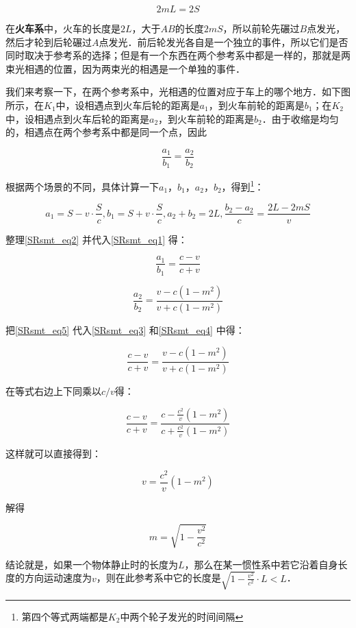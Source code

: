 \begin{equation}\label{SRsmt_eq1}
2mL=2S
\end{equation}

在\textbf{火车系}中，火车的长度是$2L$，大于$AB$的长度$2mS$，所以前轮先碾过$B$点发光，然后才轮到后轮碾过$A$点发光．前后轮发光各自是一个独立的事件，所以它们是否同时取决于参考系的选择；但是有一个东西在两个参考系中都是一样的，那就是两束光相遇的位置，因为两束光的相遇是一个单独的事件．

我们来考察一下，在两个参考系中，光相遇的位置对应于车上的哪个地方．如下图所示，在$K_1$中，设相遇点到火车后轮的距离是$a_1$，到火车前轮的距离是$b_1$；在$K_2$中，设相遇点到火车后轮的距离是$a_2$，到火车前轮的距离是$b_2$．由于收缩是均匀的，相遇点在两个参考系中都是同一个点，因此

\begin{equation}\label{SRsmt_eq5}
\frac{a_1}{b_1}=\frac{a_2}{b_2}
\end{equation}

根据两个场景的不同，具体计算一下$a_1$，$b_1$，$a_2$，$b_2$，得到\footnote{第四个等式两端都是$K_2$中两个轮子发光的时间间隔}：

\begin{equation}\label{SRsmt_eq2}
a_1=S-v\cdot\frac{S}{c},b_1=S+v\cdot\frac{S}{c},a_2+b_2=2L,\frac{b_2-a_2}{c}=\frac{2L-2mS}{v}
\end{equation}

整理\autoref{SRsmt_eq2} 并代入\autoref{SRsmt_eq1} 得：

\begin{equation}\label{SRsmt_eq3}
\frac{a_1}{b_1}=\frac{c-v}{c+v}
\end{equation}

\begin{equation}\label{SRsmt_eq4}
\frac{a_2}{b_2}=\frac{v-c(1-m^2)}{v+c(1-m^2)}
\end{equation}

把\autoref{SRsmt_eq5} 代入\autoref{SRsmt_eq3} 和\autoref{SRsmt_eq4} 中得：

\begin{equation}
\frac{c-v}{c+v}=\frac{v-c(1-m^2)}{v+c(1-m^2)}
\end{equation}

在等式右边上下同乘以$c/v$得：

\begin{equation}
\frac{c-v}{c+v}=\frac{c-\frac{c^2}{v}(1-m^2)}{c+\frac{c^2}{v}(1-m^2)}
\end{equation}

这样就可以直接得到：

\begin{equation}
v=\frac{c^2}{v}(1-m^2)
\end{equation}

解得

\begin{equation}
m=\sqrt{1-\frac{v^2}{c^2}}
\end{equation}

结论就是，如果一个物体静止时的长度为$L$，那么在某一惯性系中若它沿着自身长度的方向运动速度为$v$，则在此参考系中它的长度是$\sqrt{1-\frac{v^2}{c^2}}\cdot L<L$．






